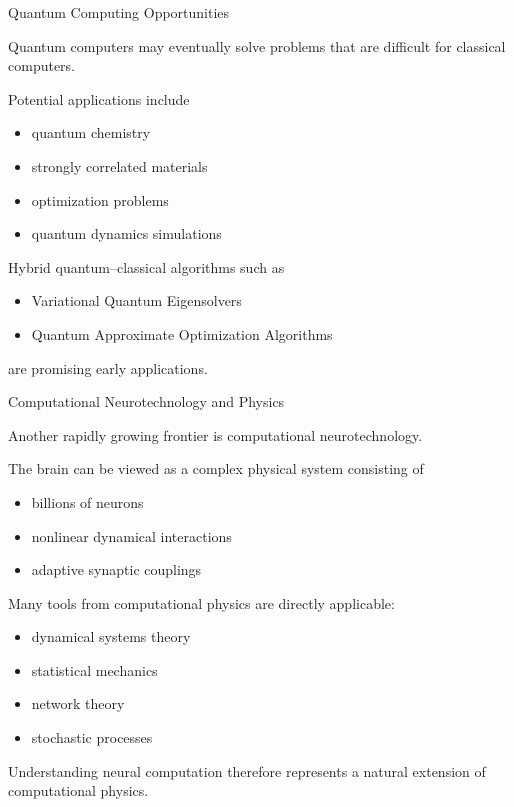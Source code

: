 \documentclass{beamer}
\begin{document}

\begin{frame}{Quantum Computing Opportunities}

Quantum computers may eventually solve problems
that are difficult for classical computers.

Potential applications include

\begin{itemize}
\item quantum chemistry
\item strongly correlated materials
\item optimization problems
\item quantum dynamics simulations
\end{itemize}

Hybrid quantum–classical algorithms such as

\begin{itemize}
\item Variational Quantum Eigensolvers
\item Quantum Approximate Optimization Algorithms
\end{itemize}

are promising early applications.

\end{frame}



\begin{frame}{Computational Neurotechnology and Physics}

Another rapidly growing frontier is computational neurotechnology.

The brain can be viewed as a complex physical system consisting of

\begin{itemize}
\item billions of neurons
\item nonlinear dynamical interactions
\item adaptive synaptic couplings
\end{itemize}

Many tools from computational physics are directly applicable:

\begin{itemize}
\item dynamical systems theory
\item statistical mechanics
\item network theory
\item stochastic processes
\end{itemize}

Understanding neural computation therefore represents a natural
extension of computational physics.
\end{frame}
\end{document}
